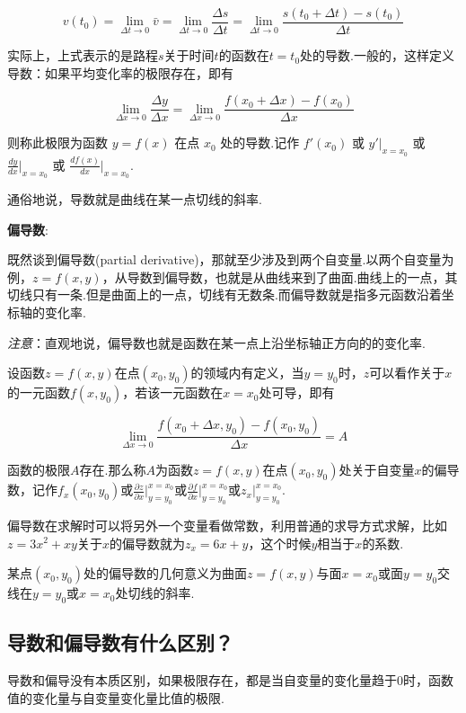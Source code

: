 \[
v(t_0)=\lim_{\Delta t \to 0}{\bar{v}}=\lim_{\Delta t \to 0}{\frac{\Delta s}{\Delta t}}=\lim_{\Delta t \to 0}{\frac{s(t_0+\Delta t)-s(t_0)}{\Delta t}}
\]

实际上，上式表示的是路程\(s\)关于时间\(t\)的函数在\(t=t_0\)处的导数.一般的，这样定义导数：如果平均变化率的极限存在，即有

\[
\lim_{\Delta x \to 0}{\frac{\Delta y}{\Delta x}}=\lim_{\Delta x \to 0}{\frac{f(x_0+\Delta x)-f(x_0)}{\Delta x}}
\]

则称此极限为函数 \(y=f(x)\) 在点 \(x_0\) 处的导数.记作 \(f'(x_0)\) 或
\(y'\vert_{x=x_0}\) 或 \(\frac{dy}{dx}\vert_{x=x_0}\) 或
\(\frac{df(x)}{dx}\vert_{x=x_0}\).

通俗地说，导数就是曲线在某一点切线的斜率.

\textbf{偏导数}:

既然谈到偏导数(partial
derivative)，那就至少涉及到两个自变量.以两个自变量为例，\(z=f(x,y)​\)，从导数到偏导数，也就是从曲线来到了曲面.曲线上的一点，其切线只有一条.但是曲面上的一点，切线有无数条.而偏导数就是指多元函数沿着坐标轴的变化率.

\emph{注意}：直观地说，偏导数也就是函数在某一点上沿坐标轴正方向的的变化率.

设函数\(z=f(x,y)​\)在点\((x_0,y_0)​\)的领域内有定义，当\(y=y_0​\)时，\(z​\)可以看作关于\(x​\)的一元函数\(f(x,y_0)​\)，若该一元函数在\(x=x_0​\)处可导，即有

\[
\lim_{\Delta x \to 0}{\frac{f(x_0+\Delta x,y_0)-f(x_0,y_0)}{\Delta x}}=A
\]

函数的极限\(A\)存在.那么称\(A\)为函数\(z=f(x,y)\)在点\((x_0,y_0)\)处关于自变量\(x\)的偏导数，记作\(f_x(x_0,y_0)\)或\(\frac{\partial z}{\partial x}\vert_{y=y_0}^{x=x_0}\)或\(\frac{\partial f}{\partial x}\vert_{y=y_0}^{x=x_0}\)或\(z_x\vert_{y=y_0}^{x=x_0}\).

偏导数在求解时可以将另外一个变量看做常数，利用普通的求导方式求解，比如\(z=3x^2+xy\)关于\(x\)的偏导数就为\(z_x=6x+y\)，这个时候\(y\)相当于\(x\)的系数.

某点\((x_0,y_0)\)处的偏导数的几何意义为曲面\(z=f(x,y)\)与面\(x=x_0\)或面\(y=y_0\)交线在\(y=y_0\)或\(x=x_0\)处切线的斜率.

\subsection{导数和偏导数有什么区别？}\label{ux5bfcux6570ux548cux504fux5bfcux6570ux6709ux4ec0ux4e48ux533aux522b}

导数和偏导没有本质区别，如果极限存在，都是当自变量的变化量趋于0时，函数值的变化量与自变量变化量比值的极限.

